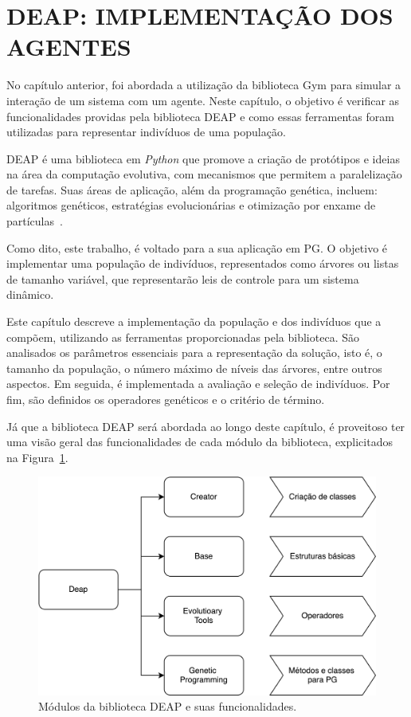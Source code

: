 \section{DEAP: IMPLEMENTAÇÃO DOS AGENTES}\label{sec:3deap-implagentes}

No capítulo anterior, foi abordada a utilização da biblioteca Gym para simular a interação de um sistema com um agente. Neste capítulo, o objetivo é verificar as funcionalidades providas pela biblioteca DEAP e como essas ferramentas foram utilizadas para representar indivíduos de uma população.

DEAP é uma biblioteca em \textit{Python} que promove a criação de protótipos e ideias na área da
computação evolutiva, com mecanismos que permitem a paralelização de tarefas. Suas áreas de aplicação, além da
programação genética, incluem: algoritmos genéticos, estratégias evolucionárias e otimização por enxame de partículas~\cite{deapdocs}.

Como dito, este trabalho, é voltado para a sua aplicação em PG.\@
O objetivo é implementar uma população de indivíduos,
representados como árvores ou listas de tamanho variável, que
representarão leis de controle para um sistema dinâmico.

Este capítulo descreve a implementação da população e dos indivíduos que a compõem, utilizando as ferramentas proporcionadas pela biblioteca. São analisados os parâmetros essenciais para a representação da solução, isto é, o tamanho da população, o número máximo de níveis das árvores, entre outros aspectos. Em seguida, é implementada a avaliação e seleção de indivíduos. Por fim, são definidos os operadores genéticos e o critério de término.

Já que a biblioteca DEAP será abordada ao longo deste capítulo, é proveitoso ter uma
visão geral das funcionalidades de cada módulo da biblioteca, explicitados na Figura~\ref{fig:3deap-modulos}.

\begin{figure}[H]
	\centering
	\includegraphics[width=0.7\linewidth]{02_desenvolvimento/03_Deap_Fig_Modulos.png}
	\caption{Módulos da biblioteca DEAP e suas funcionalidades.}\label{fig:3deap-modulos}
\end{figure}

